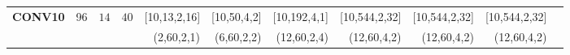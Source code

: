 \begin{table}[]
\begin{threeparttable}
\begin{tabular}{lrrrrrrrrrr }
\multirow{-2}{*}{\textbf{CONV10}} &\multirow{-2}{*}{96}&\multirow{-2}{*}{$14$} & \multirow{-2}{*}{$40$}&[10,\hspace{1em}13,\hspace{0.5em}2,\hspace{0.5em}16] &[10,\hspace{1em}50,\hspace{0.5em}4,\hspace{0.5em}\hspace{0.5em}2] &[10,\hspace{0.5em}192,\hspace{0.5em}4,\hspace{0.5em}\hspace{0.5em}1] &[10,\hspace{0.5em}544,\hspace{0.5em}2,\hspace{0.5em}32] &[10,\hspace{0.5em}544,\hspace{0.5em}2,\hspace{0.5em}32] &[10,\hspace{0.5em}544,\hspace{0.5em}2,\hspace{0.5em}32] \\
\rowcolor{Gray}& & & &(\hspace{0.5em}2,\hspace{1em}60,\hspace{0.5em}2,\hspace{0.5em}\hspace{0.5em}1) &(\hspace{0.5em}6,\hspace{1em}60,\hspace{0.5em}2,\hspace{0.5em}\hspace{0.5em}2) &(12,\hspace{1em}60,\hspace{0.5em}2,\hspace{0.5em}\hspace{0.5em}4) &(12,\hspace{1em}60,\hspace{0.5em}4,\hspace{0.5em}\hspace{0.5em}2) &(12,\hspace{1em}60,\hspace{0.5em}4,\hspace{0.5em}\hspace{0.5em}2) &(12,\hspace{1em}60,\hspace{0.5em}4,\hspace{0.5em}\hspace{0.5em}2) \\

\end{tabular}
\end{threeparttable}
\end{table}
